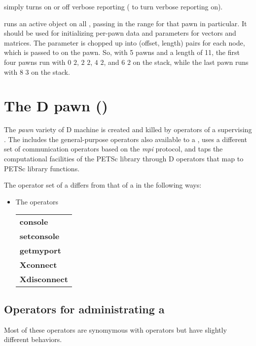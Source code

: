  simply turns on or off verbose reporting
( to turn verbose reporting on).

 runs an active object on all ,
passing in the range for that pawn in particular. It should be used
for initializing per-pawn data and parameters for vectors and
matrices. The parameter  is chopped up into (offset,
length) pairs for each node, which is passed to  on
the pawn. So, with 5 pawns and a length of 11, the first four pawns
run  with $0$ $2$, $2$ $2$, $4$ $2$, and $6$ $2$ on
the stack, while the last pawn runs  with $8$ $3$ on
the stack.


\section{The D pawn ()}

The \emph{pawn} variety of D machine is created and killed by
operators of a supervising . The  includes the
general-purpose operators also available to a , uses a
different set of communication operators based on the \emph{mpi}
protocol, and taps the computational facilities of the PETSc library
through D operators that map to PETSc library functions.

The operator set of a  differs from that of a
 in the following ways:
\begin{itemize}
\item The operators \\
\begin{tabular}{>{\sffamily\bfseries}l}
console             \\
setconsole          \\
getmyport           \\
Xconnect            \\
Xdisconnect         \\
\end{tabular}
\end{itemize}

\subsection{Operators for administrating a }

Most of these operators are synomymous with  operators but
have slightly different behaviors.

